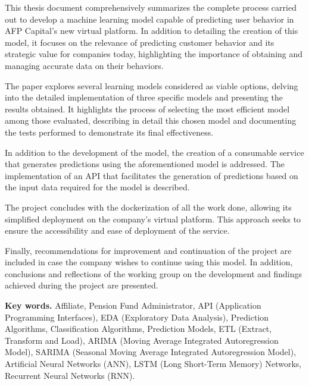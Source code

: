 This thesis document comprehensively summarizes the complete process carried out to develop a machine learning model capable of predicting user behavior in AFP Capital's new virtual platform. In addition to detailing the creation of this model, it focuses on the relevance of predicting customer behavior and its strategic value for companies today, highlighting the importance of obtaining and managing accurate data on their behaviors.

The paper explores several learning models considered as viable options, delving into the detailed implementation of three specific models and presenting the results obtained. It highlights the process of selecting the most efficient model among those evaluated, describing in detail this chosen model and documenting the tests performed to demonstrate its final effectiveness.

In addition to the development of the model, the creation of a consumable service that generates predictions using the aforementioned model is addressed. The implementation of an API that facilitates the generation of predictions based on the input data required for the model is described.

The project concludes with the dockerization of all the work done, allowing its simplified deployment on the company's virtual platform. This approach seeks to ensure the accessibility and ease of deployment of the service.

Finally, recommendations for improvement and continuation of the project are included in case the company wishes to continue using this model. In addition, conclusions and reflections of the working group on the development and findings achieved during the project are presented.

\textbf{Key words.}  Affiliate, Pension Fund Administrator, API (Application Programming Interfaces), EDA (Exploratory Data Analysis), Prediction Algorithms, Classification Algorithms, Prediction Models, ETL (Extract, Transform and Load), ARIMA (Moving Average Integrated Autoregression Model), SARIMA (Seasonal Moving Average Integrated Autoregression Model), Artificial Neural Networks (ANN), LSTM (Long Short-Term Memory) Networks, Recurrent Neural Networks (RNN).